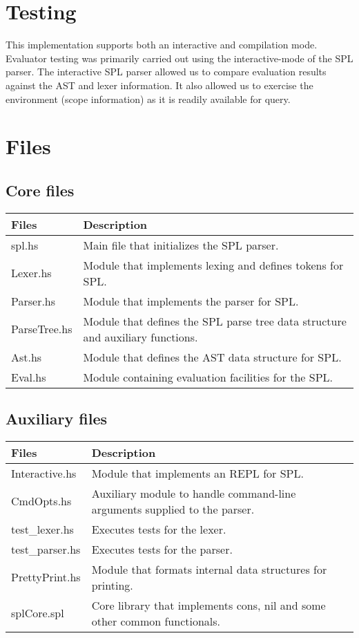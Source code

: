 \documentclass{article}
\begin{document}
\section{Testing}

This implementation supports both an interactive and compilation mode. Evaluator
testing was primarily carried out using the interactive-mode of the SPL parser.
The interactive SPL parser allowed us to compare evaluation results against the
AST and lexer information. It also allowed us to exercise the environment 
(scope information) as it is readily available for query.

\section{Files}
\subsection{Core files}
\begin{tabular}{|l|l|}
  \hline
{\bf Files}&{\bf Description}\\
  \hline
spl.hs & Main file that initializes the SPL parser.\\
  \hline
Lexer.hs & Module that implements lexing and defines tokens for SPL.\\
  \hline
Parser.hs & Module that implements the parser for SPL.\\
  \hline
ParseTree.hs & Module that defines the SPL parse tree data structure and 
auxiliary functions.\\
  \hline
Ast.hs & Module that defines the AST data structure for SPL.\\
  \hline
Eval.hs & Module containing evaluation facilities for the SPL.\\
  \hline
\end{tabular}
\subsection{Auxiliary files}
\begin{tabular}{|l|l|}
  \hline
{\bf Files}&{\bf Description}\\
  \hline
Interactive.hs & Module that implements an REPL for SPL.\\
  \hline
CmdOpts.hs & Auxiliary module to handle command-line arguments supplied to the 
parser.\\
  \hline
test_lexer.hs & Executes tests for the lexer.\\
  \hline
test_parser.hs & Executes tests for the parser.\\
  \hline
PrettyPrint.hs & Module that formats internal data structures for printing.\\
  \hline
splCore.spl & Core library that implements cons, nil and some other common 
functionals.\\
  \hline
\end{tabular}
\end{document}
